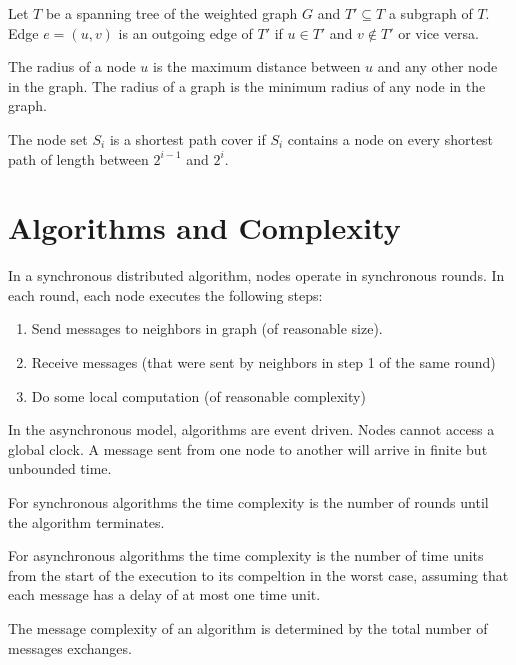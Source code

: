 \documentclass[11pt, oneside]{book}   						%
\begin{document}
\begin{mydef} Let $T$ be a spanning tree of the weighted graph $G$ and $T'\subseteq T$ a subgraph of $T$. Edge $e=(u,v)$ is an outgoing edge of $T'$ if $u\in T'$  and $v\notin T'$ or vice versa.\end{mydef}
\begin{mydef}[Radius] The radius of a node $u$ is the maximum distance between $u$ and any other node in the graph. The radius of a graph is the minimum radius of any node in the graph.\end{mydef}
\begin{mydef} The node set $S_i$ is a shortest path cover if $S_i$ contains a node on every shortest path of length between $2^{i-1}$ and $2^i$.\end{mydef}

\section{Algorithms and Complexity}
\begin{mydef} In a synchronous distributed algorithm, nodes operate in synchronous rounds. In each round, each node executes the following steps: 
\begin{enumerate}
	\item Send messages to neighbors in graph (of reasonable size).
	\item Receive messages (that were sent by neighbors in step 1 of the same round)
	\item Do some local computation (of reasonable complexity)
\end{enumerate}\end{mydef}
\begin{mydef} In the asynchronous model, algorithms are event driven. Nodes cannot access a global clock. A message sent from one node to another will arrive in finite but unbounded time.\end{mydef}
\begin{mydef} For synchronous algorithms the time complexity is the number of rounds until the algorithm terminates.\end{mydef}
\begin{mydef} For asynchronous algorithms the time complexity is the number of time units from the start of the execution to its compeltion in the worst case, assuming that each message has a delay of at most one time unit.\end{mydef}
\begin{mydef} The message complexity of an algorithm is determined by the total number of messages exchanges.\end{mydef}
\end{document}
